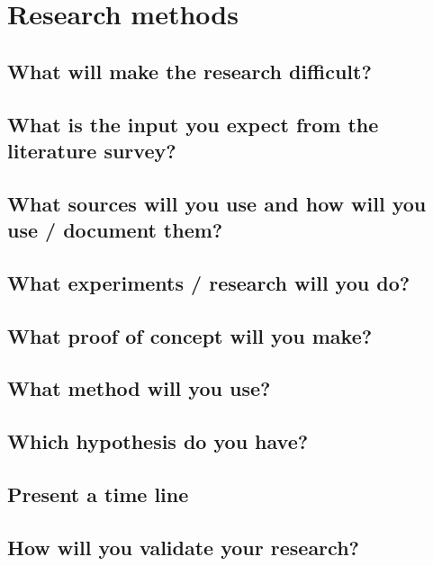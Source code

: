 \chapter{Research methods}
\lipsum[6]

\section[Difficulties]{What will make the research difficult?}
\lipsum[7]

\section[Literature input]{What is the input you expect from the literature survey?}
\lipsum[8]

\section[Information sources]{What sources will you use and how will you use / document them?}
\lipsum[9]

\section[Experiments]{What experiments / research will you do?}
\lipsum[10]

\section[Proof of concept]{What proof of concept will you make?}
\lipsum[11]

\section[Methods]{What method will you use?}
\lipsum[12]

\section[Hypotheses]{Which hypothesis do you have?}
\lipsum[13]

\section[Timeline]{Present a time line}
\lipsum[14]

\section[Validation]{How will you validate your research?}
\lipsum[15]
